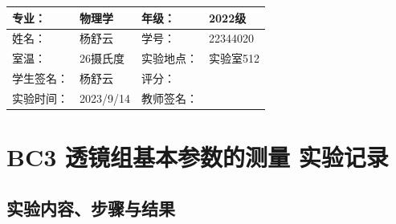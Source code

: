 \documentclass[dvipsnames, svgnames,a4paper,11pt]{article}
\begin{document}
	\clearpage
	\begin{table}
		\renewcommand\arraystretch{1.7}
		\centering
		\begin{tabularx}{\textwidth}{|X|X|X|X|}
			\hline
			专业： & 物理学 & 年级： & 2022级 \\
			\hline
			姓名： & 杨舒云 & 学号： & 22344020\\
			\hline
			室温： & 26摄氏度 & 实验地点： & 实验室512 \\
			\hline
			学生签名：& 杨舒云 & 评分： &\\
			\hline
			实验时间：& 2023/9/14 & 教师签名：&\\
			\hline
		\end{tabularx}
	\end{table}
	
	\section{BC3 透镜组基本参数的测量 \quad\heiti 实验记录}
	\subsection{实验内容、步骤与结果}
\end{document}
